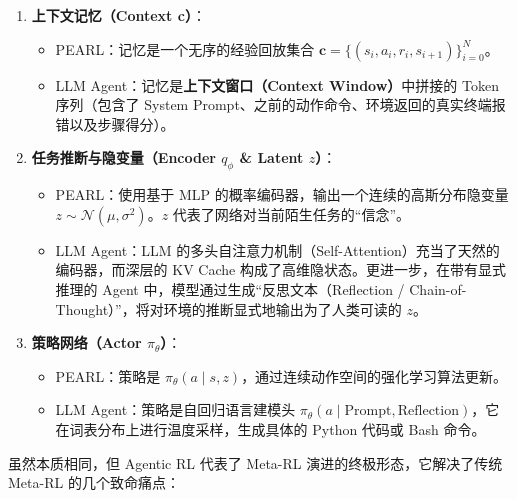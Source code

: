 \begin{enumerate}
\def\labelenumi{\arabic{enumi}.}
\tightlist
\item
  \textbf{上下文记忆（Context c）}：

  \begin{itemize}
  \tightlist
  \item
    PEARL：记忆是一个无序的经验回放集合 \(\mathbf{c}=\{(s_i,a_i,r_i,s_{i+1})\}_{i=0}^{N}\)。
  \item
    LLM Agent：记忆是\textbf{上下文窗口（Context Window）}中拼接的 Token 序列（包含了 System Prompt、之前的动作命令、环境返回的真实终端报错以及步骤得分）。
  \end{itemize}
\item
  \textbf{任务推断与隐变量（Encoder \(q_{\phi}\) \& Latent \(z\)）}：

  \begin{itemize}
  \tightlist
  \item
    PEARL：使用基于 MLP 的概率编码器，输出一个连续的高斯分布隐变量 \(z\sim\mathcal{N}(\mu,\sigma^2)\)。\(z\) 代表了网络对当前陌生任务的``信念''。
  \item
    LLM Agent：LLM 的多头自注意力机制（Self-Attention）充当了天然的编码器，而深层的 KV Cache 构成了高维隐状态。更进一步，在带有显式推理的 Agent 中，模型通过生成``反思文本（Reflection / Chain-of-Thought）''，将对环境的推断显式地输出为了人类可读的 \(z\)。
  \end{itemize}
\item
  \textbf{策略网络（Actor \(\pi_{\theta}\)）}：

  \begin{itemize}
  \tightlist
  \item
    PEARL：策略是 \(\pi_{\theta}(a\mid s,z)\)，通过连续动作空间的强化学习算法更新。
  \item
    LLM Agent：策略是自回归语言建模头 \(\pi_{\theta}(a\mid\mathrm{Prompt},\mathrm{Reflection})\)，它在词表分布上进行温度采样，生成具体的 Python 代码或 Bash 命令。
  \end{itemize}
\end{enumerate}

虽然本质相同，但 Agentic RL 代表了 Meta-RL 演进的终极形态，它解决了传统 Meta-RL 的几个致命痛点：


